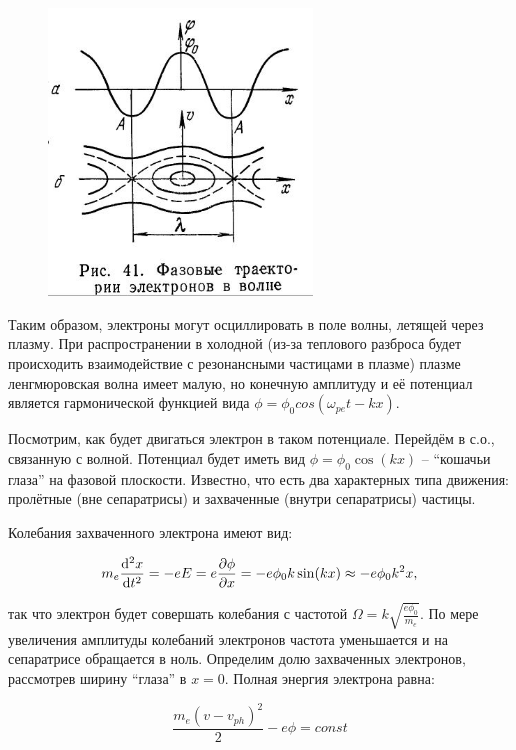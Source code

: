 \documentclass[10pt, a4paper]{article}
\begin{document}
\begin{figure}[ht]
	\begin{center}
		\includegraphics[width=70mm]{zatuh_landau_nonlinear_1.JPG}
	\end{center}
\end{figure}

Таким образом, электроны могут осциллировать в поле волны, летящей через плазму. При распространении в холодной (из-за теплового разброса будет происходить взаимодействие с резонансными частицами в плазме) плазме ленгмюровская волна имеет малую, но конечную амплитуду и её потенциал является гармонической функцией вида $\phi = \phi_0 cos(\omega_{pe} t -kx)$. 

Посмотрим, как будет двигаться электрон в таком потенциале. Перейдём в с.о., связанную с волной. Потенциал будет иметь вид $\phi = \phi_0 \cos(kx)$ -- ``кошачьи глаза'' на фазовой плоскости. Известно, что есть два характерных типа движения: пролётные (вне сепаратрисы) и захваченные (внутри сепаратрисы) частицы.

Колебания захваченного электрона имеют вид:

\begin{equation*}
	m_e \dv[2]{x}{t} =-eE = e\pdv{\phi}{x}=-e \phi_0 k  \sin(kx) \approx -e \phi_0 k^2 x,
\end{equation*}

так что электрон будет совершать колебания с частотой $\Omega =k\sqrt{\frac{e \phi_0}{m_e}}$. По мере увеличения амплитуды колебаний электронов частота уменьшается и на сепаратрисе обращается в ноль. Определим долю захваченных электронов, рассмотрев ширину ``глаза'' в $x=0$. Полная энергия электрона равна:

\begin{equation*}
	\frac{m_e (v-v_{ph})^2}{2} - e \phi =const
\end{equation*}
\end{document}
